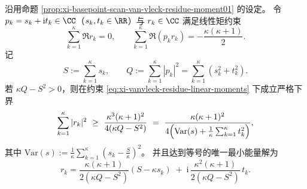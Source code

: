 \begin{theorem}\label{thm:xi-vanvleck-residue-l2-lower-bound}
沿用命题 \ref{prop:xi-basepoint-scan-van-vleck-residue-moment01} 的设定。
令 \(p_k=s_k+\mathrm{i}t_k\in\CC\)（\(s_k,t_k\in\RR\)）与 \(r_k\in\CC\) 满足线性矩约束
\begin{equation}\label{eq:xi-vanvleck-residue-linear-moments}
\sum_{k=1}^{\kappa}\Re r_k=0,
\qquad
\sum_{k=1}^{\kappa}\Re(p_k r_k)= -\frac{\kappa(\kappa+1)}{2}.
\end{equation}
记
\[
S:=\sum_{k=1}^{\kappa}s_k,\qquad
Q:=\sum_{k=1}^{\kappa}|p_k|^2=\sum_{k=1}^{\kappa}(s_k^2+t_k^2).
\]
若 \(\kappa Q-S^2>0\)，则在约束 \eqref{eq:xi-vanvleck-residue-linear-moments} 下成立严格下界
\begin{equation}\label{eq:xi-vanvleck-residue-energy-lb}
\sum_{k=1}^{\kappa}|r_k|^2
\ \ge\
\frac{\kappa^3(\kappa+1)^2}{4(\kappa Q-S^2)}
\ =\
\frac{\kappa(\kappa+1)^2}{4\Bigl(\mathrm{Var}(s)+\frac1\kappa\sum_{k=1}^{\kappa}t_k^2\Bigr)},
\end{equation}
其中 \(\mathrm{Var}(s):=\frac1\kappa\sum_{k=1}^{\kappa}(s_k-\frac{S}{\kappa})^2\)。
并且达到等号的唯一最小能量解为
\begin{equation}\label{eq:xi-vanvleck-residue-energy-minimizer}
r_k
=
\frac{\kappa(\kappa+1)}{2(\kappa Q-S^2)}(S-\kappa s_k)
\;+\;
\mathrm{i}\,\frac{\kappa^2(\kappa+1)}{2(\kappa Q-S^2)}\,t_k.
\end{equation}
\end{theorem}
